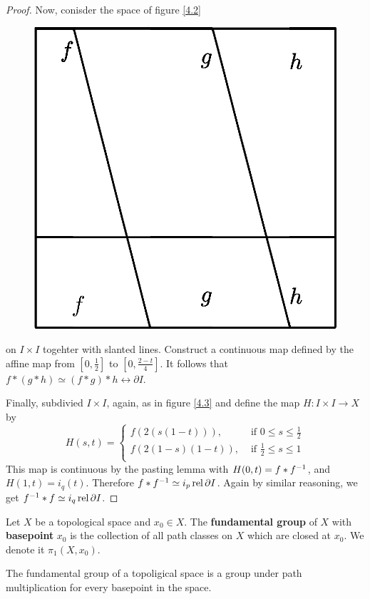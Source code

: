 \begin{proof}
    Now, conisder the space of figure \ref{4.2}
    \begin{figure}[h]
        \centering
        \includegraphics[scale=0.5]{Figures/Chapter4/path_associativity.eps}
        \caption{}
        \label{fig_4.2}
    \end{figure}
    on $I \times I$ togehter with slanted lines. Construct a continuous map
    defined by the affine map from $[0,\frac{1}{2}]$ to $[0,\frac{2-t}{4}]$. It
    follows that $f \ast (g \ast h) \simeq (f \ast g) \ast h \rel{\partial{I}}$.

    Finally, subdivied $I \times I$, again, as in figure \ref{4.3} and define
    the map $H:I \times I \xrightarrow{} X$ by
    \begin{equation*}
       H(s,t)=\begin{cases}
           f(2(s(1-t))), & \text{ if } 0 \leq s \leq \frac{1}{2}    \\
           f(2(1-s)(1-t)), & \text{ if } \frac{1}{2} \leq s \leq 1  \\
            \end{cases}
    \end{equation*}
    This map is continuous by the pasting lemma with $H(0,t)=f \ast f^{-1}$,
    and $H(1,t)=i_q(t)$. Therefore $f \ast f^{-1} \simeq i_p
    \operatorname{rel}{\partial{I}}$. Again by similar reasoning, we get $f^{-1} \ast f
    \simeq i_q \operatorname{rel}{\partial{I}}$.
\end{proof}

\begin{definition}
    Let $X$ be a topological space and  $x_0 \in X$. The \textbf{fundamental
    group} of $X$ with \textbf{basepoint} $x_0$ is the collection of all path
    classes on $X$ which are closed at $x_0$. We denote it $\pi_1(X,x_0)$.
\end{definition}

\begin{theorem}\label{4.1.5}
    The fundamental group of a topoligical space is a group under path
    multiplication for every basepoint in the space.
\end{theorem}
